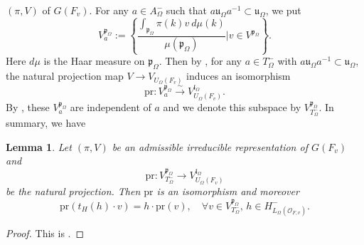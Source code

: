 \documentclass[12pt,oneside,reqno]{amsart}
\theoremstyle{plain}
\newtheorem{lemma}[theorem]{Lemma}
\begin{document}
	$(\pi,V)$ of $G(F_v)$.
	For any
	$a\in A_\Omega^-$
	such that
	$a\mathfrak{u}_\Omega a^{-1}
	\subset
	\mathfrak{u}_\Omega$,
	we put
	\[
	V^{\mathfrak{p}_\Omega}_a
	:=
	\left\{
	\frac{\int_{\mathfrak{p}_\Omega}\pi(k)v\ d\mu(k)}{\mu(\mathfrak{p}_\Omega)}
	\Big|
	v\in V^{\mathfrak{p}_\Omega}
	\right\}.
	\]
	Here $d\mu$ is the Haar measure on $\mathfrak{p}_{\Omega}$.
	Then by
	\cite[Proposition 4.1.4]{Casselman1995},
	for any
	$a\in T_\Omega^-$
	with
	$a\mathfrak{u}_\Omega a^{-1}\subset
	\mathfrak{u}_\Omega$,
	the natural projection map
	$V\rightarrow
	V_{U_\Omega(F_v)}$
	induces an isomorphism	  
	\[
	\mathrm{pr}
	\colon
	V^{\mathfrak{p}_\Omega}_a
	\xrightarrow{\sim}
	V_{U_\Omega(F_v)}^{\mathfrak{l}_\Omega}.
	\]
	By
	\cite[Proposition 4.1.6]{Casselman1995},
	these
	$V^{\mathfrak{p}_\Omega}_a$
	are independent of $a$
	and we denote this subspace by
	$V^{\mathfrak{p}_\Omega}_{T_\Omega^-}$.
	In summary, we have
	\begin{lemma}\label{projection of parahoric invariant gives iso}
		Let
		$(\pi,V)$ be an admissible irreducible representation of
		$ G(F_v)$
		and
		\[
		\mathrm{pr}
		\colon
		V^{\mathfrak{p}_\Omega}_{T_\Omega^-}
		\rightarrow
		V_{U_\Omega(F_v)}^{\mathfrak{l}_\Omega}
		\]
		be the natural projection.
		Then
		$\mathrm{pr}$
		is an isomorphism
		and moreover
		\[
		\mathrm{pr}
		(t_H(h)\cdot v)
		=
		h\cdot\mathrm{pr}(v),
		\quad
		\forall
		v\in V^{\mathfrak{p}_\Omega}_{T_\Omega^-},
		\,
		h\in H_{L_\Omega(\mathcal{O}_{F,v})}^-.
		\]
	\end{lemma}
	\begin{proof}
		This is
		\cite[Lemma II.9]{Vigneras1998}.	
	\end{proof}
	
\end{document}
